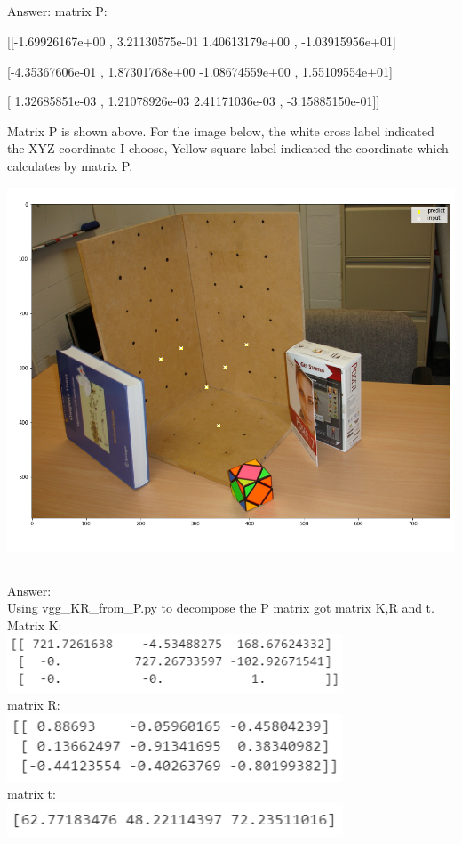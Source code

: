 \documentclass[]{article}
\begin{document}
\subsection{}
Answer: matrix P: 

[[-1.69926167e+00 , 3.21130575e-01  1.40613179e+00 , -1.03915956e+01]

[-4.35367606e-01 , 1.87301768e+00 -1.08674559e+00 , 1.55109554e+01]

[ 1.32685851e-03 , 1.21078926e-03  2.41171036e-03 , -3.15885150e-01]]

Matrix P is shown above. For the image below, the white cross label indicated the XYZ coordinate I choose, Yellow square label indicated the coordinate which calculates by matrix P.

\includegraphics[width=\textwidth]{dlt.png}

\subsection{}
Answer: \\
Using vgg\_KR\_from\_P.py to decompose the P matrix got matrix K,R and t.\\
Matrix K: \\
\includegraphics[width=10cm]{k.png}\\
matrix R: \\
\includegraphics[width=10cm]{r.png}\\
matrix t: \\
\includegraphics[width=10cm]{t.png}
\end{document}
